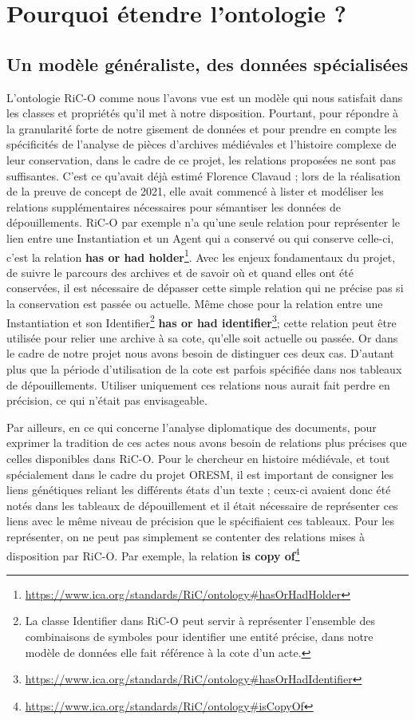 \section{Pourquoi étendre l'ontologie ?}
\subsection{Un modèle généraliste, des données spécialisées}
L'ontologie RiC-O comme nous l'avons vue est un modèle qui nous satisfait dans les classes et propriétés qu'il met à notre disposition. Pourtant, pour répondre à la granularité forte de notre gisement de données et pour prendre en compte les spécificités de l'analyse de pièces d'archives médiévales et l'histoire complexe de leur conservation, dans le cadre de ce projet, les relations proposées ne sont pas suffisantes. C'est ce qu'avait déjà estimé Florence Clavaud ; lors de la réalisation de la preuve de concept de 2021, elle avait commencé à lister et modéliser les relations supplémentaires nécessaires pour sémantiser les données de dépouillements. RiC-O par exemple n'a qu'une seule relation pour représenter le lien entre une Instantiation et un Agent qui a conservé ou qui conserve celle-ci, c'est la relation \textbf{has or had holder}\footnote{\href{https://www.ica.org/standards/RiC/ontology\#hasOrHadHolder}{https://www.ica.org/standards/RiC/ontology\#hasOrHadHolder}}. Avec les enjeux fondamentaux du projet, de suivre le parcours des archives et de savoir où et quand elles ont été conservées, il est nécessaire de dépasser cette simple relation qui ne précise pas si la conservation est passée ou actuelle. Même chose pour la relation entre une Instantiation et son Identifier\footnote{La classe Identifier dans RiC-O peut servir à représenter l'ensemble des combinaisons de symboles pour identifier une entité précise, dans notre modèle de données elle fait référence à la cote d'un acte. } \textbf{has or had identifier}\footnote{\href{https://www.ica.org/standards/RiC/ontology\#hasOrHadIdentifier}{https://www.ica.org/standards/RiC/ontology\#hasOrHadIdentifier}}; cette relation peut être utilisée pour relier une archive à sa cote, qu'elle soit actuelle ou passée. Or dans le cadre de notre projet nous avons besoin de distinguer ces deux cas. D'autant plus que la période d'utilisation de la cote est parfois spécifiée dans nos tableaux de dépouillements. Utiliser uniquement ces relations nous aurait fait perdre en précision, ce qui n'était pas envisageable.
\par
Par ailleurs, en ce qui concerne l'analyse diplomatique des documents, pour exprimer la tradition de ces actes nous avons besoin de relations plus précises que celles disponibles dans RiC-O. Pour le chercheur en histoire médiévale, et tout spécialement dans le cadre du projet ORESM, il est important de consigner les liens génétiques reliant les différents états d'un texte ; ceux-ci avaient donc été notés dans les tableaux de dépouillement et il était nécessaire de représenter ces liens avec le même niveau de précision que le spécifiaient ces tableaux. Pour les représenter, on ne peut pas simplement se contenter des relations mises à disposition par RiC-O. Par exemple, la relation \textbf{is copy of}\footnote{\href{https://www.ica.org/standards/RiC/ontology\#isCopyOf}{https://www.ica.org/standards/RiC/ontology\#isCopyOf}}

